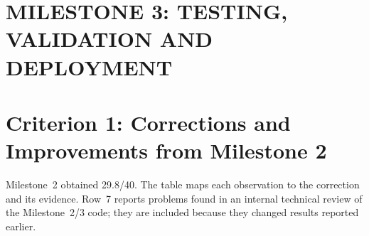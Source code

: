 \documentclass[12pt,a4paper]{article}
\begin{document}
\newpage
\section*{MILESTONE 3: TESTING, VALIDATION AND DEPLOYMENT}

\section{Criterion 1: Corrections and Improvements from Milestone 2}
\label{sec:c1}

Milestone~2 obtained 29.8/40. The table maps each observation to the correction and its evidence.
Row~7 reports problems found in an internal technical review of the Milestone~2/3 code; they are
included because they changed results reported earlier.
\end{document}
